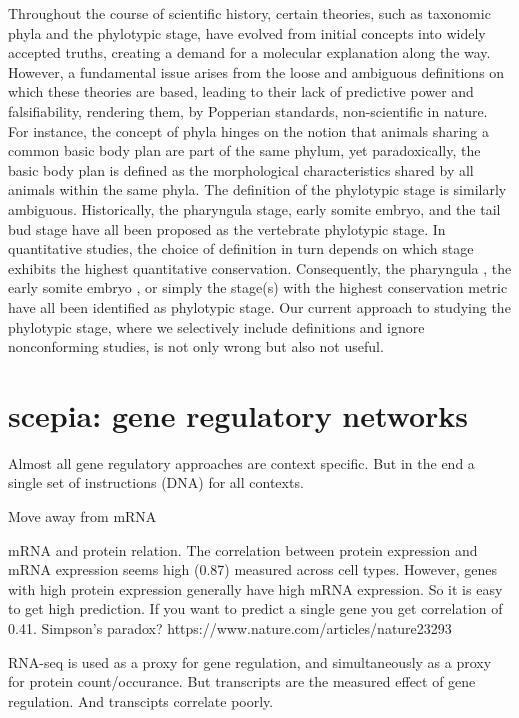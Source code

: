 Throughout the course of scientific history, certain theories, such as taxonomic phyla and the phylotypic stage, have evolved from initial concepts into widely accepted truths, creating a demand for a molecular explanation along the way. However, a fundamental issue arises from the loose and ambiguous definitions on which these theories are based, leading to their lack of predictive power and falsifiability, rendering them, by Popperian standards, non-scientific in nature. For instance, the concept of phyla hinges on the notion that animals sharing a common basic body plan are part of the same phylum, yet paradoxically, the basic body plan is defined as the morphological characteristics shared by all animals within the same phyla\cite{BUDD2000}. The definition of the phylotypic stage is similarly ambiguous. Historically, the pharyngula stage\cite{BALLARD1981}, early somite embryo\cite{Alberch1993}, and the tail bud stage \cite{Slack1993} have all been proposed as the vertebrate phylotypic stage. In quantitative studies, the choice of definition in turn depends on which stage exhibits the highest quantitative conservation. Consequently, the pharyngula \cite{Irie2011,marletaz2018}, the early somite embryo \cite{DomazetLoso2010}, or simply the stage(s) with the highest conservation metric\cite{Kalinka2010,Cordero2020} have all been identified as phylotypic stage. Our current approach to studying the phylotypic stage, where we selectively include definitions and ignore nonconforming studies, is not only wrong but also not useful.

\section{scepia: gene regulatory networks}

Almost all gene regulatory approaches are context specific. But in the end a single set of instructions (DNA) for all contexts.

Move away from mRNA

mRNA and protein relation.
The correlation between protein expression and mRNA expression seems high (0.87) measured across cell types. However, genes with high protein expression generally have high mRNA expression. So it is easy to get high prediction. If you want to predict a single gene you get correlation of 0.41. Simpson's paradox?
https://www.nature.com/articles/nature23293

RNA-seq is used as a proxy for gene regulation, and simultaneously as a proxy for protein count/occurance. But transcripts are the measured effect of gene regulation. And transcipts correlate poorly.

